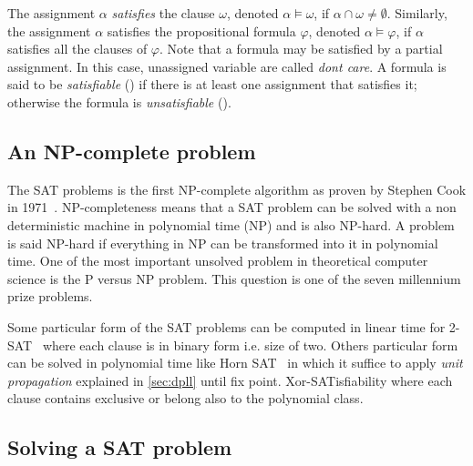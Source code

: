 The assignment $\alpha$ \emph{satisfies} the clause $\omega$, denoted $\alpha
\models \omega$, if $\alpha \cap \omega \neq \emptyset$. Similarly, the assignment
$\alpha$ satisfies the propositional formula $\varphi$, denoted $\alpha \models
\varphi$, if $\alpha$ satisfies all the clauses of $\varphi$. Note that a
formula may be satisfied by a partial assignment. In this case, unassigned variable are called
\emph{dont care}.
A formula is said to be
\emph{satisfiable} (\sat) if there is at least one assignment that satisfies it;
otherwise the formula is \emph{unsatisfiable} (\unsat).

\subsection{An NP-complete problem}

The SAT problems is the first NP-complete algorithm as proven by Stephen Cook in 1971~\cite{cook1971complexity}.
NP-completeness means that a SAT problem can be solved with a non deterministic machine in polynomial time (NP) and is also NP-hard. A problem is said NP-hard if everything in NP can be transformed into it in polynomial time. 
One of the most important unsolved problem in theoretical computer science is the P versus NP problem.
This question is one of the seven millennium prize problems.

Some particular form of the SAT problems can be computed in linear time for 2-SAT~\cite{aspvall1979linear}
where each clause is in binary form i.e. size  of two. %
Others particular form  can be solved in  polynomial time like Horn SAT~\cite{aspvall1979linear} in which it suffice to  apply \emph{unit propagation} explained in \cref{sec:dpll} until fix point.
Xor-SATisfiability where each clause contains exclusive or belong also to the polynomial class.

%
%


\subsection{Solving a SAT problem}

